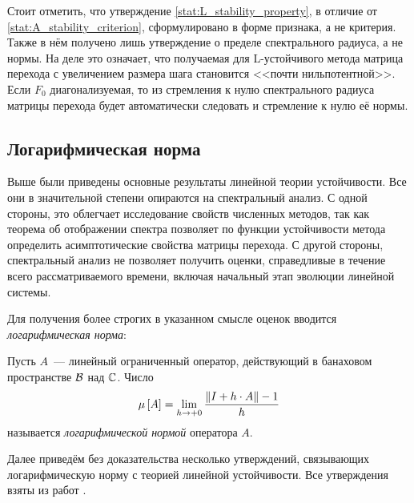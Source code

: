 Стоит отметить, что утверждение \ref{stat:L_stability_property}, в отличие от \ref{stat:A_stability_criterion}, сформулировано в форме признака, а не критерия.
Также в нём получено лишь утверждение о пределе спектрального радиуса, а не нормы.
На деле это означает, что получаемая для L-устойчивого метода матрица перехода с увеличением размера шага становится <<почти нильпотентной>>.
Если $ F_0 $ диагонализуемая, то из стремления к нулю спектрального радиуса матрицы перехода будет автоматически следовать и стремление к нулю её нормы.


\subsection{Логарифмическая норма}
\label{subsec:logarithmic_norm}

Выше были приведены основные результаты линейной теории устойчивости.
Все они в значительной степени опираются на спектральный анализ.
С одной стороны, это облегчает исследование свойств численных методов,
так как теорема об отображении спектра позволяет по функции устойчивости метода
определить асимптотические свойства матрицы перехода.
С другой стороны, спектральный анализ не позволяет получить оценки,
справедливые в течение всего рассматриваемого времени,
включая начальный этап эволюции линейной системы.

Для получения более строгих в указанном смысле оценок вводится \emph{логарифмическая норма}:

\begin{definition}
    \label{def:logarithmic_norm}
    Пусть $ A $~--- линейный ограниченный оператор, действующий в банаховом пространстве $ \mathcal{B} $ над $ \mathbb{C} $.
    Число
    \begin{equation}
        \label{eq:logarithmic_norm}
        \mu \left[ A \right] = \lim_{h \to +0} \frac{\| I + h \cdot A \| - 1}{h}
    \end{equation}
    называется \emph{логарифмической нормой} оператора $ A $.
\end{definition}

Далее приведём без доказательства несколько утверждений,
связывающих логарифмическую норму с теорией линейной устойчивости.
Все утверждения взяты из работ \cite{soderlind2006lognorm, lambert1991methods}.

